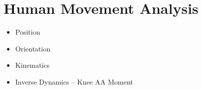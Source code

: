 

\section{Human Movement Analysis}
\begin{itemize}
    \item Position
    \item Orientation
    \item Kinematics
    \item Inverse Dynamics -- Knee AA Moment
\end{itemize}